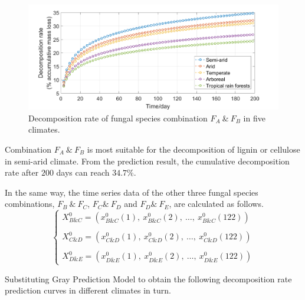 \begin{figure}[H]
  \centering
  \label{decompositioninfiveclimates}
  \includegraphics[width=\textwidth]{figures/A&B.png}
  \caption{Decomposition rate of fungal species combination $F_A\ \&\ F_B$ in five climates.}
\end{figure}
Combination $F_A\ \&\ F_B$ is most suitable for the decomposition of lignin or cellulose in semi-arid climate. From the prediction result, the cumulative decomposition rate after $200$ days can reach $34.7\%$.
\par
In the same way, the time series data of the other three fungal species combinations, $F_B\ \&\ F_C$, $F_C \&\ F_D$ and $F_D \&\ F_E$, are calculated as follows.
\begin{equation*}
  \begin{cases}
    X^0_{B\&C} = (x^0_{B\&C}(1),\ x^0_{B\&C}(2),\ \ldots,\ x^0_{B\&C}(122)) \\ \\
    X^0_{C\&D} = (x^0_{C\&D}(1),\ x^0_{C\&D}(2),\ \ldots,\ x^0_{C\&D}(122)) \\ \\
    X^0_{D\&E} = (x^0_{D\&E}(1),\ x^0_{D\&E}(2),\ \ldots,\ x^0_{D\&E}(122))
  \end{cases}
\end{equation*}
\par
Substituting Gray Prediction Model to obtain the following decomposition rate prediction curves in different climates in turn.
\par
\begin{figure}[H]
  \centering
\end{figure}
